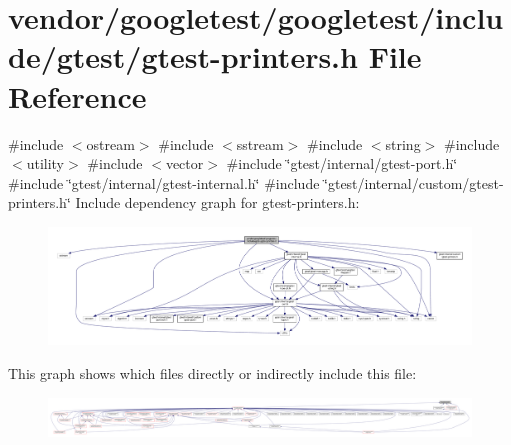 \hypertarget{gtest-printers_8h}{}\section{vendor/googletest/googletest/include/gtest/gtest-\/printers.h File Reference}
\label{gtest-printers_8h}
{\ttfamily \#include $<$ostream$>$}\newline
{\ttfamily \#include $<$sstream$>$}\newline
{\ttfamily \#include $<$string$>$}\newline
{\ttfamily \#include $<$utility$>$}\newline
{\ttfamily \#include $<$vector$>$}\newline
{\ttfamily \#include \char`\"{}gtest/internal/gtest-\/port.\+h\char`\"{}}\newline
{\ttfamily \#include \char`\"{}gtest/internal/gtest-\/internal.\+h\char`\"{}}\newline
{\ttfamily \#include \char`\"{}gtest/internal/custom/gtest-\/printers.\+h\char`\"{}}\newline
Include dependency graph for gtest-\/printers.h\+:
\nopagebreak
\begin{figure}[H]
\begin{center}
\leavevmode
\includegraphics[width=350pt]{gtest-printers_8h__incl}
\end{center}
\end{figure}
This graph shows which files directly or indirectly include this file\+:
\nopagebreak
\begin{figure}[H]
\begin{center}
\leavevmode
\includegraphics[width=350pt]{gtest-printers_8h__dep__incl}
\end{center}
\end{figure}
